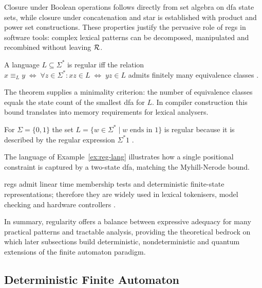 Closure under Boolean operations follows directly from set algebra on \gls{dfa} state sets,  
while closure under concatenation and star is established with product and power set constructions.  
These properties justify the pervasive role of \glspl{reg} in software tools:  
complex lexical patterns can be decomposed, manipulated and recombined without leaving ${\cal R}$.  

\begin{theorem}\label{thm:myhill-nerode}
A language $L\subseteq\Sigma^{\ast}$ is regular  
iff the relation
$x\equiv_{L}y \;\Longleftrightarrow\; \forall z\in\Sigma^{\ast}\colon  
xz\in L \;\Leftrightarrow\; yz\in L$
admits finitely many equivalence classes \cite{hopcroft2001introduction}.  
\end{theorem}

The theorem supplies a minimality criterion:  
the number of equivalence classes equals the state count of the smallest \gls{dfa} for $L$.  
In compiler construction this bound translates into memory requirements for lexical analysers.  

\begin{example}\label{ex:reg-lang}
For $\Sigma=\{0,1\}$ the set
$L=\{w\in\Sigma^{\ast}\mid w\text{ ends in }1\}$ is regular because it
is described by the regular expression $\Sigma^{\ast}1$ \cite{hopcroft2001introduction}.  
\end{example}

The language of Example~\ref{ex:reg-lang} illustrates how a single positional constraint  
is captured by a two-state \gls{dfa}, matching the Myhill-Nerode bound.  

\begin{observation}\label{obs:why-regular-matters}
\glspl{reg} admit linear time membership tests and deterministic
finite-state representations; therefore they are widely used in lexical
tokenisers, model checking and hardware controllers \cite{aho1974design}.  
\end{observation}

In summary, regularity offers a balance between expressive adequacy for many practical patterns  
and tractable analysis, providing the theoretical bedrock on which later subsections build deterministic,  
nondeterministic and quantum extensions of the finite automaton paradigm.

\subsection{Deterministic Finite Automaton}\label{subsec:dfa}

